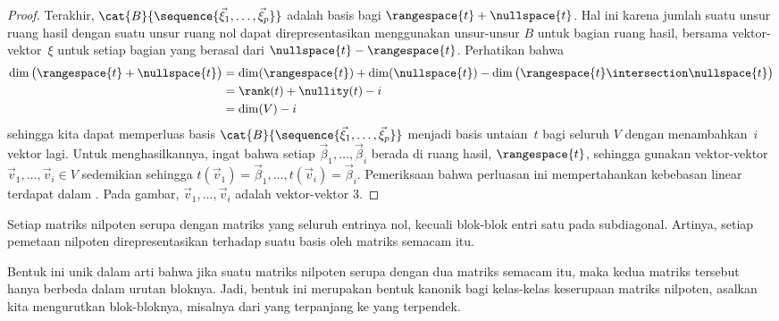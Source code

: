 \begin{proof}
Terakhir, \( \cat{B}{\sequence{\vec{\xi}_1,\dots,\vec{\xi}_p}} \)
adalah basis bagi \( \rangespace{t}+\nullspace{t} \).
Hal ini karena jumlah suatu unsur ruang hasil dengan suatu unsur ruang nol
dapat direpresentasikan menggunakan unsur-unsur \( B \) untuk bagian ruang
hasil, bersama vektor-vektor~$\xi$ untuk setiap bagian yang berasal dari
\( \nullspace{t}-\rangespace{t} \).
Perhatikan bahwa
\begin{align*}
  \dim\big(\rangespace{t}+\nullspace{t}\big)
  &=
  \dim (\rangespace{t})+\dim (\nullspace{t})
    -\dim\big(\rangespace{t}\intersection\nullspace{t}\big)  \\
  &=
  \rank (t)+\nullity (t)-i          \\
  &=
  \dim (V)-i
\end{align*}
sehingga kita dapat memperluas basis
\( \cat{B}{\sequence{\vec{\xi}_1,\dots,\vec{\xi}_p}} \) 
menjadi basis untaian~$t$ bagi seluruh
\( V \) dengan menambahkan~\( i \) vektor lagi.
Untuk menghasilkannya,
ingat bahwa setiap \( \vec{\beta}_1,\dots,\vec{\beta}_i \) berada
di ruang hasil, \( \rangespace{t} \),
sehingga gunakan vektor-vektor
\( \vec{v}_1,\dots,\vec{v}_i\in V \) sedemikian sehingga
\( t(\vec{v}_1)=\vec{\beta}_1,\dots,t(\vec{v}_i)=\vec{\beta}_i \).
Pemeriksaan bahwa perluasan ini mempertahankan kebebasan linear terdapat dalam
.
Pada gambar, \( \vec{v}_1,\dots,\vec{v}_i \) adalah vektor-vektor \( 3 \).
\end{proof}

\begin{corollary} \label{cor:NilpotentMatCanonForm}
Setiap matriks nilpoten serupa dengan matriks yang seluruh entrinya nol,
kecuali blok-blok entri satu pada subdiagonal.
Artinya, setiap pemetaan nilpoten direpresentasikan terhadap suatu basis
oleh matriks semacam itu.
\end{corollary}

Bentuk ini unik dalam arti bahwa jika suatu matriks nilpoten serupa dengan dua
matriks semacam itu, maka kedua matriks tersebut hanya berbeda dalam urutan bloknya.
Jadi, bentuk ini merupakan
bentuk kanonik bagi kelas-kelas keserupaan matriks nilpoten,
asalkan kita mengurutkan blok-bloknya, misalnya dari yang terpanjang ke yang terpendek.


